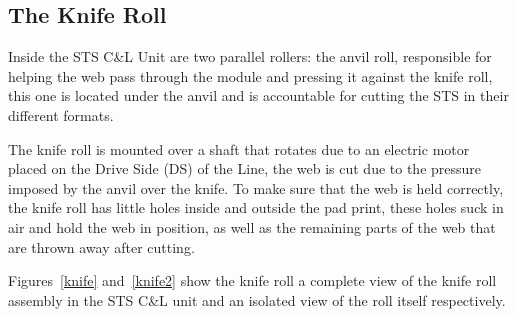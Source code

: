 
\subsection{The Knife Roll}\label{sec2.1.1}


Inside the STS C\&L Unit are two parallel rollers: the anvil roll, responsible for helping the web pass through the module and pressing it against the knife roll, this one is located under the anvil and is accountable for cutting the STS in their different formats. 

The knife roll is mounted over a shaft that rotates due to an electric motor placed on the Drive Side (DS) of the Line, the web is cut due to the pressure imposed by the anvil over the knife. To make sure that the web is held correctly, the knife roll has little holes inside and outside the pad print, these holes suck in air and hold the web in position, as well as the remaining parts of the web that are thrown away after cutting.

Figures~\ref{knife} and~\ref{knife2} show the knife roll a complete view of the knife roll assembly in the STS C\&L unit and an isolated view of the roll itself respectively. 

